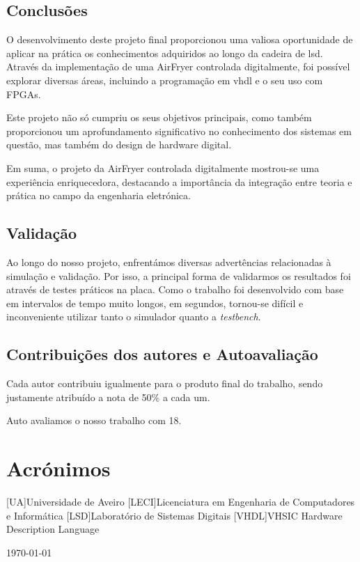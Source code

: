 \documentclass[a4paper, 11pt, onecolumn, oneside]{report}
\begin{document}
\section{Conclusões}
O desenvolvimento deste projeto final proporcionou uma valiosa oportunidade de aplicar na prática os conhecimentos adquiridos ao longo da cadeira de \ac{lsd}. Através da implementação de uma AirFryer controlada digitalmente, foi possível explorar diversas áreas, incluindo a programação em \ac{vhdl} e o  seu uso com FPGAs.

Este projeto não só cumpriu os seus objetivos principais, como também proporcionou um aprofundamento significativo no conhecimento dos sistemas em questão, mas também do design de hardware digital. 

Em suma, o projeto da AirFryer controlada digitalmente mostrou-se uma experiência enriquecedora, destacando a importância da integração entre teoria e prática no campo da engenharia eletrónica. 

\section{Validação}
Ao longo do nosso projeto, enfrentámos diversas advertências relacionadas à simulação e validação. Por isso, a principal forma de validarmos os resultados foi através de testes práticos na placa. Como o trabalho foi desenvolvido com base em intervalos de tempo muito longos, em segundos, tornou-se difícil e inconveniente utilizar tanto o simulador quanto a \textit{testbench}.

\section{Contribuições dos autores e Autoavaliação}
Cada autor contribuiu igualmente para o produto final do trabalho, sendo justamente atribuído a nota de 50\% a cada um.

Auto avaliamos o nosso trabalho com 18.

\chapter*{Acrónimos}
\begin{acronym}
[UA]{Universidade de Aveiro}
[LECI]{Licenciatura em Engenharia de Computadores e Informática}
[LSD]{Laboratório de Sistemas Digitais}
[VHDL]{VHSIC Hardware Description Language}
\end{acronym}

\begin{flushright}
    \today
\end{flushright}
\end{document}
